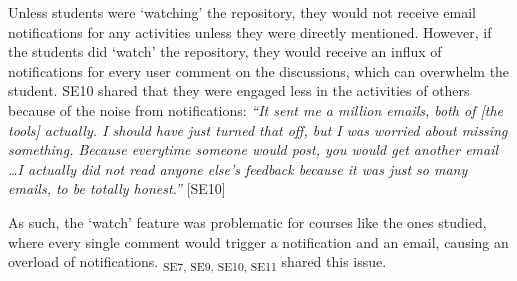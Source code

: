 Unless students were `watching' the repository, they would not receive email notifications for any activities unless they were directly mentioned. However, if the students did `watch' the repository, they would receive an influx of notifications for every user comment on the discussions, which can overwhelm the student. SE10 shared that they were engaged less in the activities of others because of the noise from notifications: \textit{``It sent me a million emails, both of [the tools] actually. I should have just turned that off, but I was worried about missing something. Because everytime someone would post, you would get another email \ldots I actually did not read anyone else's feedback because it was just so many emails, to be totally honest.''} [SE10]

As such, the `watch' feature was problematic for courses like the ones studied, where every single comment would trigger a notification and an email, causing an overload of notifications. \textsubscript{SE7, SE9, SE10, SE11} shared this issue.







